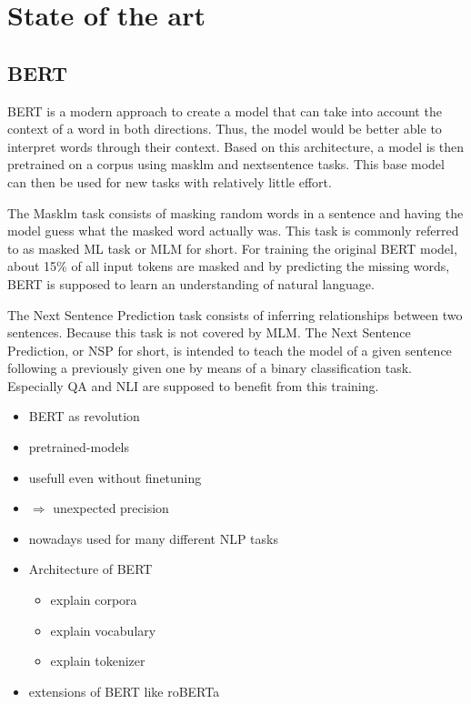 \chapter{State of the art}
\section{BERT}
\color{red}
BERT is a modern approach to create a model that can take into account the context of a word in both directions. Thus, the model would be better able to interpret words through their context. Based on this architecture, a model is then pretrained on a corpus using masklm and nextsentence tasks. This base model can then be used for new tasks with relatively little effort.

The Masklm task consists of masking random words in a sentence and having the model guess what the masked word actually was. This task is commonly referred to as masked ML task or MLM for short. For training the original BERT model, about 15\% of all input tokens are masked and by predicting the missing words, BERT is supposed to learn an understanding of natural language.

The Next Sentence Prediction task consists of inferring relationships between two sentences. Because this task is not covered by MLM. The Next Sentence Prediction, or NSP for short, is intended to teach the model of a given sentence following a previously given one by means of a binary classification task. Especially QA and NLI are supposed to benefit from this training. 
\color{black}
\color{ForestGreen}
\begin{itemize}
	\item BERT as revolution
	\item pretrained-models
	\item usefull even without finetuning
	\item $\Rightarrow$ unexpected precision
	\item nowadays used for many different NLP tasks
	\item Architecture of BERT
	\begin{itemize}
		\item explain corpora
		\item explain vocabulary
		\item explain tokenizer
	\end{itemize}
	\item extensions of BERT like roBERTa
\end{itemize}
\color{black}
